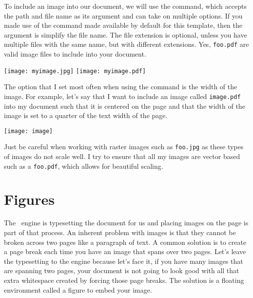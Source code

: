 To include an image into our document, we will use the  
command, which accepts the path and file name as its argument and can take 
on multiple options.  If you made use of the  command made 
available by default for this template, then the argument is simplify the file 
name.  The file extension is optional, unless you have multiple files with the 
same name, but with different extensions. Yes, \verb!foo.pdf! are valid 
image files to include into your document. 
\begin{dispListing}
    \texttt{[image: myimage.jpg]}
    \texttt{[image: myimage.pdf]}
\end{dispListing}
The option that I set most often when using the 
command is the width of the image.  For example, let's say that I want to 
include an image called \verb!image.pdf! into my document such that it is 
centered on the page and that the width of the image is set to a quarter of 
the text width of the page. 
\begin{dispExample}
\begin{center}
\texttt{[image: image]}
\end{center}
\end{dispExample}
Just be careful when working with raster images such as \verb!foo.jpg! as 
these types of images do not scale well.  I try to ensure that all my images 
are vector based such as a \verb!foo.pdf!, which allows for beautiful scaling.


\section{Figures}

The \XeLaTeX\ engine is typesetting the document for us and placing images on 
the page is part of that process.  An inherent problem with images is that they 
cannot be broken across two pages like a paragraph of text.  A common
solution is to create a page break each time you have an image that spans over 
two pages.  Let's leave the typesetting to the engine because let's face it,
if you have many images that are spanning two pages, your document is not going 
to look good with all that extra whitespace created by forcing those page breaks.
The solution is a floating environment called a figure to embed your image. 

